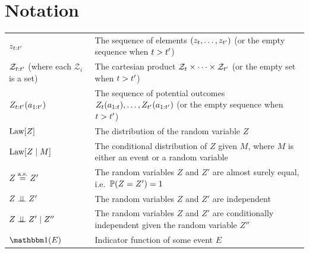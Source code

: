 \section{Notation} \label{sec:notation}

\begin{tabularx}{\linewidth}{l X}
$z_{t:t'}$ & The sequence of elements $(z_t, \ldots, z_{t'})$ (or the empty sequence when $t > t'$) \\
$\mathcal{Z}_{t:t'}$ (where each $\mathcal{Z}_{i}$ is a set) & The cartesian product $\mathcal{Z}_{t} \times \cdots \times \mathcal{Z}_{t'}$ (or the empty set when $t > t'$) \\
$Z_{t:t'}(a_{1:t'})$ & The sequence of potential outcomes $Z_t(a_{1:t}), \ldots, Z_{t'}(a_{1:t'})$ (or the empty sequence when $t > t'$) \\
$\mathrm{Law}[Z]$ & The distribution of the random variable $Z$ \\
$\mathrm{Law}[Z \mid M]$ & The conditional distribution of $Z$ given $M$, where $M$ is either an event or a random variable \\
$Z \overset{\mathrm{a.s.}}{=} Z'$ & The random variables $Z$ and $Z'$ are almost surely equal, i.e.\ $\mathbb{P}(Z = Z') = 1$ \\
$Z \perp\!\!\!\perp Z'$ & The random variables $Z$ and $Z'$ are independent \\
$Z \perp\!\!\!\perp Z' \mid Z''$ & The random variables $Z$ and $Z'$ are conditionally independent given the random variable $Z''$ \\
$\ind(E)$ & Indicator function of some event $E$ %
\end{tabularx}

